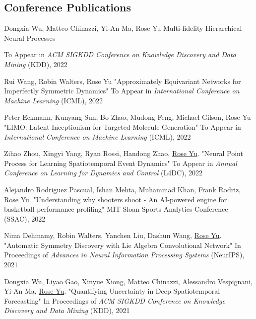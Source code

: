 \documentclass[margin,line]{res}
\begin{document}
\begin{resume}
\section{\sc Conference Publications}

\begin{enumerate}[label={[C\arabic*]}]

\item 
Dongxia Wu, Matteo Chinazzi, Yi-An Ma, Rose Yu
Multi-fidelity Hierarchical Neural Processes

To Appear in \textit{ACM SIGKDD Conference on Knowledge Discovery and Data Mining} (KDD), 2022

\item 
Rui Wang, Robin Walters, Rose Yu
"Approximately Equivariant Networks for Imperfectly Symmetric Dynamics"
To Appear in \textit{International Conference on Machine Learning} (ICML), 2022

\item 
Peter Eckmann, Kunyang Sun, Bo Zhao, Mudong Feng, Michael Gilson, Rose Yu
"LIMO: Latent Inceptionism for Targeted Molecule Generation" To Appear in \textit{International Conference on Machine Learning} (ICML), 2022
 

\item 
 Zihao Zhou, Xingyi Yang, Ryan Rossi, Handong Zhao, \underline{Rose Yu}.
"Neural Point Process for Learning Spatiotemporal Event Dynamics"  To Appear in \textit{Annual Conference on Learning for Dynamics and Control}
 (L4DC), 2022
 
 \item Alejandro Rodriguez Pascual, Ishan Mehta, 
Muhammad Khan, Frank Rodriz, \underline{Rose Yu}. "Understanding why shooters shoot - An AI-powered engine for basketball performance profiling" MIT Sloan Sports Analytics Conference (SSAC), 2022 
 
\item 
Nima Dehmamy, Robin Walters, Yanchen Liu, Dashun Wang, \underline{Rose Yu}. "Automatic Symmetry Discovery with Lie Algebra Convolutional Network"
In Proceedings of \textit{Advances in Neural Information Processing Systems} (NeurIPS), 2021

\item Dongxia Wu, Liyao Gao, Xinyue Xiong, Matteo Chinazzi, Alessandro Vespignani, Yi-An Ma, \underline{Rose Yu}.
"Quantifying Uncertainty in Deep Spatiotemporal Forecasting"
In Proceedings of \textit{ACM SIGKDD Conference on Knowledge Discovery and Data Mining} (KDD), 2021


\end{enumerate}
\end{resume}
\end{document}
